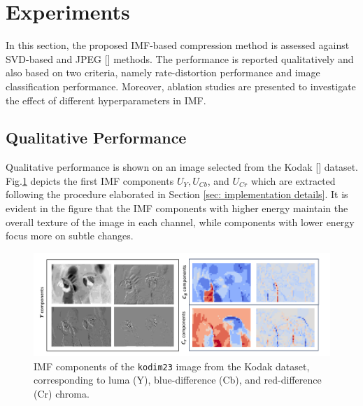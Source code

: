 \section{Experiments} \label{sec: experiments}

In this section, the proposed IMF-based compression method is assessed against SVD-based and JPEG [] methods.
The performance is reported qualitatively and also based on two criteria, namely rate-distortion performance and image classification performance.
Moreover, ablation studies are presented to investigate the effect of different hyperparameters in IMF.

\subsection{Qualitative Performance}
Qualitative performance is shown on an image selected from the Kodak [] dataset. 
Fig.\ref{fig:imf_components} depicts the first IMF components $U_{Y}, U_{Cb}$, and $U_{Cr}$ which are extracted following the procedure elaborated in Section \ref{sec: implementation details}. It is evident in the figure that the IMF components with higher energy maintain the overall texture of the image in each channel, while components with lower energy focus more on subtle changes. 
\begin{figure}[t]
	\centering
    \includegraphics[width=.95\textwidth]{figures/kodim23_components.pdf}
	\caption{IMF components of the \texttt{kodim23} image from the Kodak dataset, corresponding to luma (Y), blue-difference (Cb), and red-difference (Cr) chroma.}
	\label{fig:imf_components}
\end{figure}

